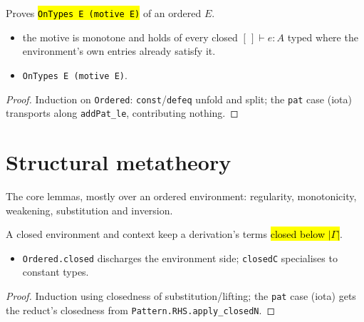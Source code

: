\begin{theorem}
\label{thm:ordered-induction}
\leanok
{}

 Proves \hl{\texttt{OnTypes E (motive E)}} of an ordered $E$.
\begin{itemize}
\item {} the motive is monotone and holds of every closed $[\,] \vdash e : A$ typed
  where the environment's own entries already satisfy it.
\item {} \texttt{OnTypes E (motive E)}.
\end{itemize}
\end{theorem}
\begin{proof}
\leanok
{} Induction on \texttt{Ordered}: \texttt{const}/\texttt{defeq} unfold and split;
the \texttt{pat} case (iota) transports along \texttt{addPat\_le}, contributing nothing.
\end{proof}

\section{Structural metatheory}

The core lemmas, mostly over an ordered environment: regularity, monotonicity, weakening,
substitution and inversion.

\begin{lemma}
\label{thm:isdefeq-closedn}
\leanok
{}

 A closed environment and context keep a derivation's terms \hl{closed below
$|\Gamma|$}.
\begin{itemize}
\item \texttt{Ordered.closed} discharges the environment side; \texttt{closedC} specialises
  to constant types.
\end{itemize}
\end{lemma}
\begin{proof}
\leanok
{} Induction using closedness of substitution/lifting; the \texttt{pat} case (iota)
gets the reduct's closedness from \texttt{Pattern.RHS.apply\_closedN}.
\end{proof}

